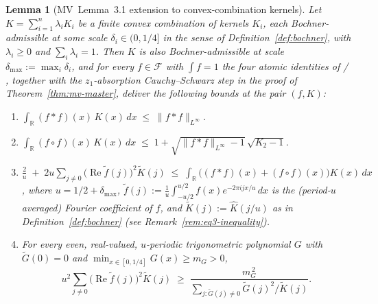 \documentclass[11pt, letterpaper]{article}
\theoremstyle{paperplain}
\newtheorem{lemma}[theorem]{Lemma}
\theoremstyle{paperdef}
\newcommand{\R}{\mathbb{R}}
\newcommand{\Linf}{L^\infty}
\begin{document}
\begin{lemma}[MV~Lemma~3.1 extension to convex-combination kernels]
\label{lem:mv-extension}
Let $K=\sum_{i=1}^{n}\lambda_i K_i$ be a finite convex combination
of kernels $K_i$, each Bochner-admissible at some scale
$\delta_i\in(0,1/4]$ in the sense of
Definition~\ref{def:bochner}, with $\lambda_i\ge 0$ and
$\sum_i\lambda_i=1$.  Then $K$ is also Bochner-admissible at scale
$\delta_{\max}:=\max_i\delta_i$, and for every
$f\in\mathcal{F}$ with $\int f=1$ the four atomic identities of
\cite[Lemma~3.1]{MV10} / \cite[Lemmas~3.1--3.4]{MO2009}, together
with the $z_1$-absorption Cauchy--Schwarz step in the proof of
Theorem~\ref{thm:mv-master}, deliver the following bounds at the
pair $(f,K)$:
\begin{enumerate}[label=\textnormal{(\arabic*)}, leftmargin=2.6em]
\item $\displaystyle\int_{\R}(f*f)(x)\,K(x)\,dx \;\le\; \|f*f\|_{\Linf}$.
\item $\displaystyle\int_{\R}(f\circ f)(x)\,K(x)\,dx \;\le\;
       1 + \sqrt{\|f*f\|_{\Linf}-1}\,\sqrt{K_2-1}$.
\item $\displaystyle\frac{2}{u} \;+\; 2u\sum_{j\ne 0}\bigl(\operatorname{Re}\widetilde{f}(j)\bigr)^{2}\widetilde{K}(j)
       \;\le\;
       \int_{\R}\bigl((f*f)(x)+(f\circ f)(x)\bigr)K(x)\,dx$,
       where $u=1/2+\delta_{\max}$,
       $\widetilde{f}(j):=\tfrac1u\int_{-u/2}^{u/2}f(x)e^{-2\pi ijx/u}\,dx$
       is the (period-$u$ averaged) Fourier coefficient of $f$, and
       $\widetilde{K}(j):=\widehat{K}(j/u)$ as in
       Definition~\ref{def:bochner} (see
       Remark~\ref{rem:eq3-inequality}).
\item For every even, real-valued, $u$-periodic trigonometric polynomial
       $G$ with $\widetilde{G}(0)=0$ and $\min_{x\in[0,1/4]}G(x)\ge m_G>0$,
\[
  u^{2}\sum_{j\ne 0}\bigl(\operatorname{Re}\widetilde{f}(j)\bigr)^{2}\widetilde{K}(j)
  \;\ge\;
  \frac{m_G^{\,2}}{\displaystyle\sum_{j:\widetilde{G}(j)\ne 0}\widetilde{G}(j)^{2}/\widetilde{K}(j)}.
\]
\end{enumerate}
\end{lemma}
\end{document}
